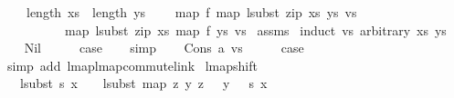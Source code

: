 \begin{isabellebody}
\ \ \ \ {\isachardoublequoteopen}length\ xs\ {\isacharequal}{\kern0pt}\ length\ ys{\isachardoublequoteclose}\isanewline
\ \ \ \ {\isachardoublequoteopen}map\ f\ {\isacharparenleft}{\kern0pt}map\ {\isacharparenleft}{\kern0pt}lsubst\ {\isacharparenleft}{\kern0pt}zip\ xs\ ys{\isacharparenright}{\kern0pt}{\isacharparenright}{\kern0pt}\ vs{\isacharparenright}{\kern0pt}\ {\isacharequal}{\kern0pt}\isanewline
\ \ \ \ \ \ \ \ \ \ map\ {\isacharparenleft}{\kern0pt}lsubst\ {\isacharparenleft}{\kern0pt}zip\ xs\ {\isacharparenleft}{\kern0pt}map\ f\ ys{\isacharparenright}{\kern0pt}{\isacharparenright}{\kern0pt}{\isacharparenright}{\kern0pt}\ vs{\isachardoublequoteclose}\isanewline
%
\isadelimproof
%
\endisadelimproof
%
\isatagproof
{}\isamarkupfalse%
\ assms\isanewline
{}\isamarkupfalse%
\ {\isacharparenleft}{\kern0pt}induct\ vs\ arbitrary{\isacharcolon}{\kern0pt}\ xs\ ys{\isacharparenright}{\kern0pt}\isanewline
\ \ \isamarkupfalse%
\ Nil\isanewline
\ \ \isamarkupfalse%
\ \isamarkupfalse%
\ {\isacharquery}{\kern0pt}case\isanewline
\ \ \isamarkupfalse%
\ simp\isanewline
{}\isamarkupfalse%
\isanewline
\ \ \isamarkupfalse%
\ {\isacharparenleft}{\kern0pt}Cons\ a\ vs{\isacharparenright}{\kern0pt}\isanewline
\ \ \isamarkupfalse%
\ \isamarkupfalse%
\ {\isacharquery}{\kern0pt}case\isanewline
\ \ \isamarkupfalse%
\ {\isacharparenleft}{\kern0pt}simp\ add{\isacharcolon}{\kern0pt}\ lmap{\isacharunderscore}{\kern0pt}lmap{\isacharunderscore}{\kern0pt}commute{\isacharunderscore}{\kern0pt}link{\isacharparenright}{\kern0pt}\isanewline
{}\isamarkupfalse%
%
\endisatagproof
{\isafoldproof}%
%
\isadelimproof
\isanewline
%
\endisadelimproof
\isanewline
\isanewline
{}\isamarkupfalse%
\ lmap{\isacharunderscore}{\kern0pt}shift{\isacharcolon}{\kern0pt}\isanewline
\ \ \ {\isachardoublequoteopen}{\isacharparenleft}{\kern0pt}lsubst\ s{\isacharparenright}{\kern0pt}\ x\ {\isacharplus}{\kern0pt}\ {}\ {\isacharequal}{\kern0pt}\ lsubst\ {\isacharparenleft}{\kern0pt}map\ {\isacharparenleft}{\kern0pt}{\isasymlambda}{\isacharparenleft}{\kern0pt}z{\isacharcomma}{\kern0pt}\ y{\isacharparenright}{\kern0pt}{\isachardot}{\kern0pt}\ {\isacharparenleft}{\kern0pt}z\ {\isacharplus}{\kern0pt}\ {}{\isacharcomma}{\kern0pt}\ y\ {\isacharplus}{\kern0pt}\ {}{\isacharparenright}{\kern0pt}{\isacharparenright}{\kern0pt}\ s{\isacharparenright}{\kern0pt}\ {\isacharparenleft}{\kern0pt}x\ {\isacharplus}{\kern0pt}\ {}{\isacharparenright}{\kern0pt}{\isachardoublequoteclose}\isanewline

\end{isabellebody}
